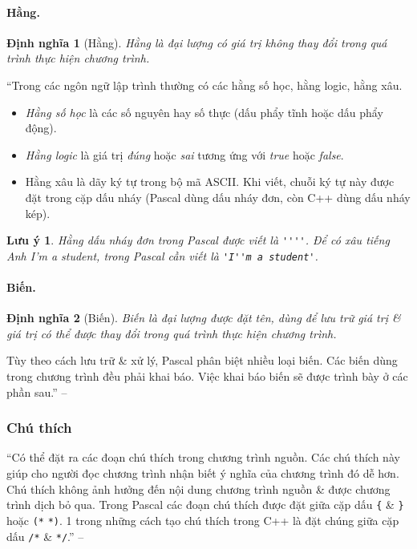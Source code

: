 \documentclass[oneside]{book}
\numberwithin{equation}{section}
\newtheorem{dinhnghia}{Định nghĩa}[section]
\newtheorem{luuy}{Lưu ý}[section]
\begin{document}
\paragraph{Hằng.}
\begin{dinhnghia}[Hằng]
	\emph{Hằng} là đại lượng có giá trị không thay đổi trong quá trình thực hiện chương trình.
\end{dinhnghia}
``Trong các ngôn ngữ lập trình thường có các hằng số học, hằng logic, hằng xâu.
\begin{itemize}
	\item \textit{Hằng số học} là các số nguyên hay số thực (dấu phẩy tĩnh hoặc dấu phẩy động).
	\item \textit{Hằng logic} là giá trị \textit{đúng} hoặc \textit{sai} tương ứng với \textit{true} hoặc \textit{false}.
	\item Hằng xâu là dãy ký tự trong bộ mã ASCII. Khi viết, chuỗi ký tự này được đặt trong cặp dấu nháy (Pascal dùng dấu nháy đơn, còn C++ dùng dấu nháy kép).
\end{itemize}

\begin{luuy}
	Hằng dấu nháy đơn trong Pascal được viết là \verb|''''|. Để có xâu tiếng Anh \emph{I'm a student}, trong Pascal cần viết là \verb|'I''m a student'|.
\end{luuy}

\paragraph{Biến.}
\begin{dinhnghia}[Biến]
	\emph{Biến} là đại lượng được đặt tên, dùng để lưu trữ giá trị \& giá trị có thể được thay đổi trong quá trình thực hiện chương trình.
\end{dinhnghia}
Tùy theo cách lưu trữ \& xử lý, Pascal phân biệt nhiều loại biến. Các biến dùng trong chương trình đều phải khai báo. Việc khai báo biến sẽ được trình bày ở các phần sau.'' -- \cite[p. 12]{SGK_Tin_Hoc_11}

\subsubsection{Chú thích}
``Có thể đặt ra các đoạn chú thích trong chương trình nguồn. Các chú thích này giúp cho người đọc chương trình nhận biết ý nghĩa của chương trình đó dễ hơn. Chú thích không ảnh hưởng đến nội dung chương trình nguồn \& được chương trình dịch bỏ qua. Trong Pascal các đoạn chú thích được đặt giữa cặp dấu \verb|{| \& \verb|}| hoặc \verb|(*| \verb|*)|. 1 trong những cách tạo chú thích trong C++ là đặt chúng giữa cặp dấu \verb|/*| \& \verb|*/|.'' -- \cite[p. 13]{SGK_Tin_Hoc_11}
\end{document}
